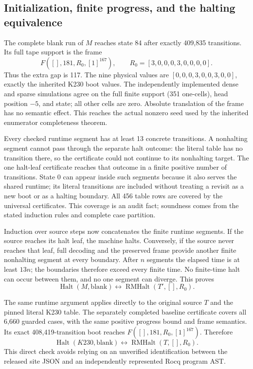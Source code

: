 \subsection{Initialization, finite progress, and the halting equivalence}

The complete blank run of $M$ reaches state 84 after exactly 409,835
transitions.  Its full tape support is the frame
\[
 F([],181,R_0,[1]^{167}),\qquad
              R_0=[3,0,0,0,3,0,0,0,0].
\]
Thus the extra gap is 117.  The nine physical values are
$[0,0,0,3,0,0,3,0,0]$, exactly the inherited K230 boot values.
The independently implemented dense and sparse simulations agree on
the full finite support (351 one-cells), head position $-5$, and state;
all other cells are zero.  Absolute translation of the frame has no
semantic effect.  This reaches the actual nonzero seed used by the
inherited enumerator completeness theorem.

Every checked runtime segment has at least 13 concrete transitions.
A nonhalting segment cannot pass through the separate halt outcome:
the literal table has no transition there, so the certificate could not
continue to its nonhalting target.  The one halt-leaf certificate reaches
that outcome in a finite positive number of transitions.  State 0 can
appear inside such segments because it also serves the shared runtime;
its literal transitions are included without treating a revisit as a new
boot or as a halting boundary.  All 456 table rows are covered by the
universal certificates.  This coverage is an audit fact; soundness comes
from the stated induction rules and complete case partition.

Induction over source steps now concatenates the finite runtime
segments.  If the source reaches its halt leaf, the machine halts.
Conversely, if the source never reaches that leaf, full decoding and the
preserved frame provide another finite nonhalting segment at every
boundary.  After $n$ segments the elapsed time is at least $13n$;
the boundaries therefore exceed every finite time.  No finite-time halt
can occur between them, and no one segment can diverge.  This proves
\begin{equation}
 \operatorname{Halt}(M,\mathrm{blank})
        \longleftrightarrow\operatorname{RMHalt}(T',[],R_0).
 \label{eq:k228-runtime-equivalence}
\end{equation}

The same runtime argument applies directly to the original source $T$
and the pinned literal K230 table. The separately completed baseline
certificate covers all 6,660 guarded cases, with the same positive
progress bound and frame semantics. Its exact 408,419-transition boot
reaches $F([],181,R_0,[1]^{167})$. Therefore
\[
 \operatorname{Halt}(K230,\mathrm{blank})
 \longleftrightarrow\operatorname{RMHalt}(T,[],R_0).
\]
This direct check avoids relying on an unverified identification between
the released site JSON and an independently represented Rocq program AST.


